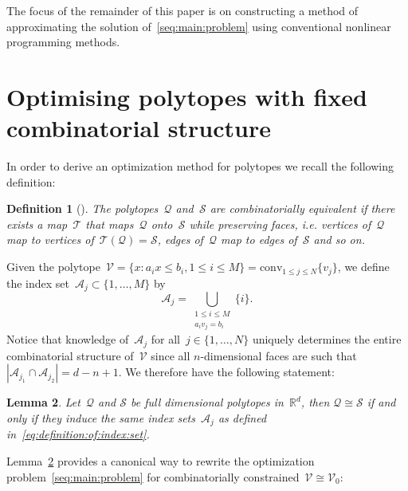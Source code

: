 \documentclass[letterpaper, 10pt, conference]{ieeeconf} %
\newtheorem{thm}{Lemma}[section]
\newtheorem{defn}[thm]{Definition}
\providecommand{\abs}[1]{\left\lvert#1\right\rvert}
\begin{document}
The focus of the remainder of this paper is on constructing a method of approximating the solution of~\eqref{seq:main:problem} using conventional nonlinear programming methods.

\section{Optimising polytopes with fixed combinatorial structure}\label{sec:optimising:polytopes}
%
%
%
\noindent In order to derive an optimization method for polytopes we recall the following definition:
%
\begin{defn}[\cite{Ziegler:1995}]
The polytopes~$\mathcal Q$ and~$\mathcal S$ are combinatorially equivalent if there exists a map~$\mathcal T$ that maps~$\mathcal Q$ onto~$\mathcal S$ while preserving faces, i.e. vertices of~$\mathcal Q$ map to vertices of~$\mathcal T(\mathcal Q)=\mathcal S$, edges of~$\mathcal Q$ map to edges of~$\mathcal S$ and so on.
\end{defn}
%
Given the polytope~$\mathcal V = \{x:a_ix\leq b_i,1\leq i\leq M\}=\text{conv}_{1\leq j\leq N}\{v_j\}$, we define the index set~$\mathcal A_j\subset\{1,\dots,M\}$ by
%
\begin{equation}\label{eq:definition:of:index:set}
	\mathcal A_j = \bigcup_{\substack{1\leq i\leq M\\ a_i v_j=b_i}}\{i\}.
\end{equation}
%
Notice that knowledge of~$\mathcal A_j$ for all~$j\in\{1,\dots,N\}$ uniquely determines the entire combinatorial structure of~$\mathcal V$ since all $n$-dimensional faces are such that $\abs{\mathcal A_{j_1}\cap\mathcal A_{j_2}}=d-n+1$.
%
We therefore have the following statement:
%
\begin{thm}\label{thm:combinatorial:equivalence}
Let~$\mathcal Q$ and $\mathcal S$ be full dimensional polytopes in~$\mathbb R^d$, then $\mathcal Q\cong\mathcal S$ if and only if they induce the same index sets~$\mathcal A_j$ as defined in~\eqref{eq:definition:of:index:set}.
\end{thm}
%
Lemma~\ref{thm:combinatorial:equivalence} provides a canonical way to rewrite the optimization problem~\eqref{seq:main:problem} for combinatorially constrained~$\mathcal V\cong\mathcal V_0$:
%
\end{document}
